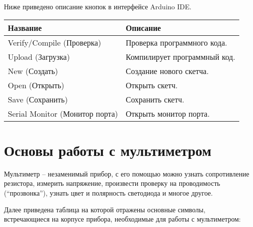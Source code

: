 \documentclass[../main.tex]{subfiles}
\begin{document}
Ниже приведено описание кнопок в интерфейсе Arduino IDE.


\begin{tabular}{p{4cm}|p{6cm}}
  Название & Описание \\
  \hline \hline
  Verify/Compile (Проверка) & Проверка программного кода. \\
  \hline
  Upload (Загрузка) & Компилирует программный код.\\
  \hline
  New (Создать) & Создание нового скетча.\\
  \hline
  Open (Открыть) & Открыть скетч.\\
  \hline
  Save (Сохранить) & Сохранить скетч.\\
  \hline
  Serial Monitor (Монитор порта) & Открыть монитор порта.\\
\end{tabular}

\section{Основы работы с мультиметром}
Мультиметр -- незаменимый прибор, с его помощью можно узнать сопротивление
резистора, измерить напряжение, произвести проверку на проводимость
(``прозвонка''), узнать цвет и полярность светодиода и многое другое.

Далее приведена таблица на которой отражены основные символы, встречающиеся на
корпусе прибора, необходимые для работы с мультиметром:
\end{document}

